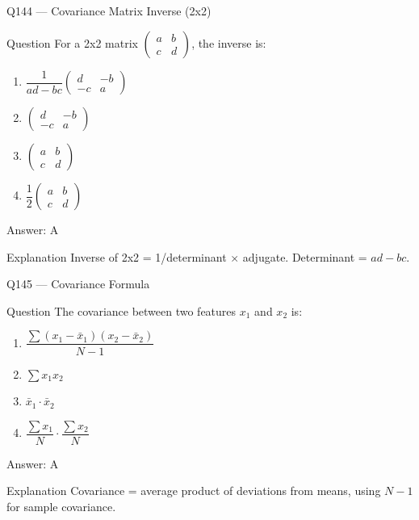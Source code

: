 \documentclass[aspectratio=169,8pt]{beamer}
\begin{document}
	\begin{frame}{Q144 --- Covariance Matrix Inverse (2x2)}
		\begin{block}{Question}
			For a 2x2 matrix $\begin{pmatrix} a & b \\ c & d \end{pmatrix}$, the inverse is:
			\begin{enumerate}
				\item $\dfrac{1}{ad - bc} \begin{pmatrix} d & -b \\ -c & a \end{pmatrix}$
				\item $\begin{pmatrix} d & -b \\ -c & a \end{pmatrix}$
				\item $\begin{pmatrix} a & b \\ c & d \end{pmatrix}$
				\item $\dfrac{1}{2} \begin{pmatrix} a & b \\ c & d \end{pmatrix}$
			\end{enumerate}
		\end{block}
		\begin{exampleblock}{Answer: A}\end{exampleblock}
		\begin{block}{Explanation}
			Inverse of 2x2 = 1/determinant $\times$ adjugate. Determinant = $ad - bc$.
		\end{block}
	\end{frame}
	
	\begin{frame}{Q145 --- Covariance Formula}
		\begin{block}{Question}
			The covariance between two features $x_1$ and $x_2$ is:
			\begin{enumerate}
				\item $\dfrac{\sum (x_1 - \bar{x}_1)(x_2 - \bar{x}_2)}{N - 1}$
				\item $\sum x_1 x_2$
				\item $\bar{x}_1 \cdot \bar{x}_2$
				\item $\dfrac{\sum x_1}{N} \cdot \dfrac{\sum x_2}{N}$
			\end{enumerate}
		\end{block}
		\begin{exampleblock}{Answer: A}\end{exampleblock}
		\begin{block}{Explanation}
			Covariance = average product of deviations from means, using $N-1$ for sample covariance.
		\end{block}
	\end{frame}
	
\end{document}
